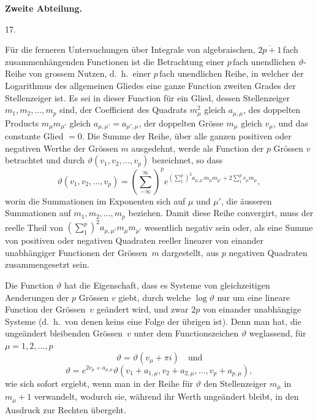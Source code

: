 \documentclass[a4paper,12pt,leqno]{article}
\begin{document}
\begin{center}
\large\bfseries
Zweite Abteilung.
\end{center}

\centerline{17.}

\nobreak\medskip

F\"{u}r die ferneren Untersuchungen \"{u}ber Integrale von
algebraischen,\break
$\overline{2p + 1} \,$\-fach zusammenh\"{a}ngenden
Functionen ist die Betrachtung einer $p \,$\-fach unendlichen
$\vartheta$-Reihe von grossem Nutzen, d.~h.\ einer $p \,$\-fach
unendlichen Reihe, in welcher der Logarithmus des allgemeinen
Gliedes eine ganze Function zweiten Grades der Stellenzeiger ist.
Es sei in dieser Function f\"{u}r ein Glied, dessen Stellenzeiger
$m_1, m_2,\ldots, m_p$
sind, der Coefficient des Quadrats $m_\mu^2$ gleich
$a_{\mu, \mu}$, des doppelten Products $m_\mu m_{\mu'}$ gleich
$a_{\mu, \mu'} = a_{\mu', \mu}$, der doppelten Gr\"{o}sse $m_\mu$
gleich $v_\mu$, und das constante Glied $= 0$.  Die Summe der
Reihe, \"{u}ber alle ganzen positiven oder negativen Werthe der
Gr\"{o}ssen $m$ ausgedehnt, werde als Function der $p$
Gr\"{o}ssen $v$ betrachtet und durch
$\vartheta(v_1, v_2,\ldots, v_p)$
bezeichnet, so dass
\begin{equation}
\label{eqn-1}
   \vartheta(v_1, v_2,\ldots, v_p)
   = \left( \sum_{-\infty}^\infty \right)^p
      e^{\left( \sum\limits_1^p \right)^2 a_{\mu, \mu'} m_\mu m_{\mu'}
            + 2 \sum\limits_1^p v_\mu m_\mu},
\end{equation}
worin die Summationen im Exponenten sich auf $\mu$ und $\mu'$,
die \"{a}usseren Summationen auf $m_1, m_2,\ldots, m_p$ beziehen.
Damit diese Reihe convergirt, muss der reelle Theil von
$\left( \sum\limits_1^p \right)^2 a_{\mu, \mu'} m_\mu m_{\mu'}$
wesentlich negativ sein oder, als eine Summe von positiven oder
negativen Quadraten reeller linearer von einander
unabh\"{a}ngiger Functionen der Gr\"{o}ssen~$m$ dargestellt, aus
$p$ negativen Quadraten zusammengesetzt sein.

Die Function $\vartheta$ hat die Eigenschaft, dass es Systeme von
gleichzeitigen Aenderungen der $p$ Gr\"{o}ssen $v$ giebt, durch
welche $\log \vartheta$ nur um eine lineare Function der
Gr\"{o}ssen~$v$ ge\"{a}ndert wird, und zwar $2p$ von einander
unabh\"{a}ngige Systeme (d.~h.\ von denen keins eine Folge der
\"{u}brigen ist).  Denn man hat, die unge\"{a}ndert bleibenden
Gr\"{o}ssen~$v$ unter dem Functionszeichen $\vartheta$
weglassend, f\"{u}r $\mu = 1,2,\ldots,p$
\begin{equation}
\label{eqn-2}
\vartheta = \vartheta( v_\mu + \pi i) \quad \mbox{und}
\end{equation}
\begin{equation}
\label{eqn-3}
\vartheta = e^{2 v_\mu + a_{\mu, \mu}}
         \vartheta( v_1 + a_{1,\mu}, v_2 + a_{2,\mu},\ldots, v_p + a_{p,\mu}),
\end{equation}
wie sich sofort ergiebt, wenn man in der Reihe f\"{u}r
$\vartheta$ den Stellenzeiger $m_\mu$ in $m_\mu + 1$ verwandelt,
wodurch sie, w\"{a}hrend ihr Werth unge\"{a}ndert bleibt, in den
Ausdruck zur Rechten \"{u}bergeht.
\end{document}
